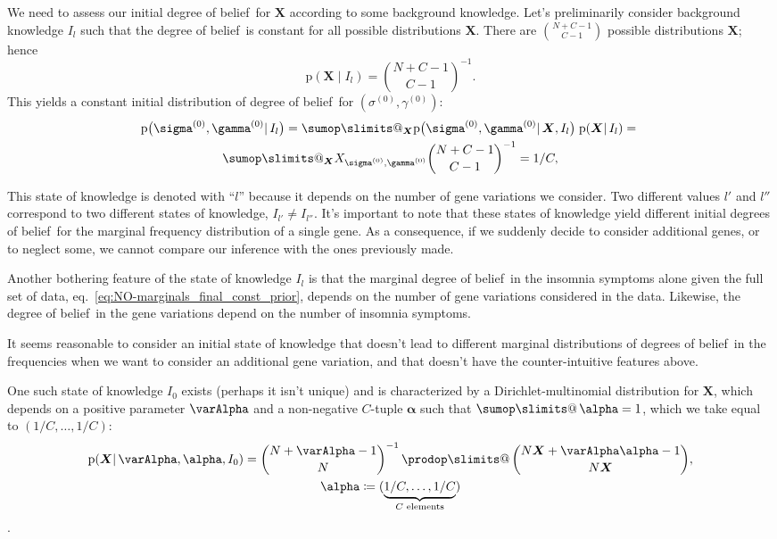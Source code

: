 \documentclass[\ifafour a4paper,12pt,\else a5paper,10pt,\fi%
onecolumn,oneside,article,%
british%
]{memoir}
\makeatletter
\theoremstyle{remark}
\theoremstyle{innote}
\def\sum{\DOTSI\sumop\slimits@}
\def\prod{\DOTSI\prodop\slimits@}
\newcommand*{\citep}{\parencites}
\newcommand*{\defd}{\coloneqq}
\newcommand*{\pf}{\mathrm{p}}%
\renewcommand*{\|}{\mathpunct{|}}
\newcommand*{\sect}{\S}%
\newcommand*{\sects}{\S\S}%
\newcommand*{\eqn}{eq.}%
\newcommand*{\tprod}{\mathop{\textstyle\prod}\nolimits}
\newcommand*{\tsum}{\mathop{\textstyle\sum}\nolimits}
\newcommand*{\puzzle}{\maltese}
\newcommand{\mynote}[1]{ {\color{notecolour}\puzzle\ #1}}
\newcommand*{\dob}{degree of belief}
\newcommand*{\dobs}{degrees of belief}
\newcommand*{\yI}{I}
\newcommand*{\ysum}{\tsum}
\newcommand*{\yprod}{\tprod}
\newcommand*{\ys}{\sigma}
\newcommand*{\yg}{\gamma}
\newcommand*{\gn}{l}
\newcommand*{\ysi}[1]{\ys^{(#1)}}
\newcommand*{\ygi}[1]{\yg^{(#1)}}
\newcommand*{\yso}{\ysi{0}}
\newcommand*{\ygo}{\ygi{0}}
\newcommand*{\yF}{\bm{X}}
\newcommand*{\yIc}{I_{\gn}}
\newcommand*{\yIo}{I_{0}}
\newcommand*{\yA}{\varAlpha}
\newcommand*{\ya}{\bm{\alpha}}
\makeatother
\begin{document}

We need to assess our initial \dob\ for $\yF$ according to some
background knowledge. Let's preliminarily consider background
knowledge $\yIc$ such that the \dob\ is constant for all possible
distributions $\yF$. There are $\binom{N+C-1}{C-1}$ possible distributions
$\yF$; hence
\begin{equation}
  \label{eq:NO-constant_prior}
  \pf(\yF \| \yIc) = \binom{N+C-1}{C-1}^{-1}.
\end{equation}
This yields a constant  initial  distribution of \dob\ for $(\yso,\ygo)$:
\begin{multline}
  \label{eq:NO-joint_prob_initial_F_unknown}
  \pf\bigl(\yso, \ygo \| \yIc\bigr)  =
  \sum_{\yF}  \pf\bigl(\yso, \ygo \| \yF,\yIc\bigr) \;
  \pf( \yF \| \yIc) ={}\\
  \sum_{\yF}  X_{\yso, \ygo} \binom{N+C-1}{C-1}^{-1}
  = 1/C,
\end{multline}

This state of knowledge is denoted with \enquote{$\gn$} because it depends
on the number of gene variations we consider. Two different values $\gn'$
and $\gn''$ correspond to two different states of knowledge,
$\yI_{\gn'} \ne \yI_{\gn''}$. It's important to note that these states of
knowledge yield different initial \dobs\ for the marginal frequency
distribution of a single gene. As a consequence, if we suddenly decide to
consider additional genes, or to neglect some, we cannot compare our
inference with the ones previously made.

Another bothering feature of the state of knowledge $\yIc$ is that the
marginal \dob\ in the insomnia symptoms alone given the full set of
data, \eqn~\eqref{eq:NO-marginals_final_const_prior}, depends on the number of
gene variations considered in the data. Likewise, the \dob\ in the
gene variations depend on the number of insomnia symptoms.

It seems reasonable to consider an initial state of knowledge that doesn't
lead to different marginal distributions of \dobs\ in the frequencies when
we want to consider an additional gene variation, and that doesn't have
the counter-intuitive features above.

One such state of knowledge $\yIo$ exists (perhaps it isn't unique) and is
characterized by a Dirichlet-multinomial distribution for $\yF$, which
depends on a positive parameter $\yA$ and a non-negative $C$-tuple $\ya$
such that $\ysum\ya=1$, which we take equal to $(1/C,\dotsc,1/C)$:
\begin{multline}
  \label{eq:NO-dirichlet_prior}
  \pf(\yF \| \yA, \ya,\yIo) =
  \binom{N+\yA-1}{N}^{-1} \yprod\binom{N\yF+\yA\ya-1}{N\yF},\\
  \ya \defd (\underbrace{1/C,\dotsc,1/C}_{\text{$C$ elements}})
\end{multline}
\citep[\sect~13.1]{johnsonetal1969_r1996}[\sect~3]{minka2000_r2012}[and
especially][\sects~3--4]{basuetal1982}.
\end{document}
